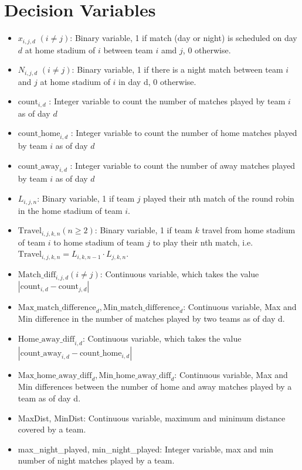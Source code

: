 \documentclass[a4paper, 12pt]{article}
\begin{document}
\section*{Decision Variables}
\begin{itemize}
    \item $x_{i,j,d}$ $(i \neq j)$: Binary variable, 1 if match (day or night) is scheduled on day $d$ at home stadium of $i$ between team $i$ amd $j$, 0 otherwise.
    \item $N_{i,j,d}$ $(i \neq j)$: Binary variable, 1 if there is a night match between team $i$ and $j$ at home stadium of $i$ in day d, 0 otherwise.
    \item $\text{count}_{i,d}$ : Integer variable to count the number of matches played by team $i$ as of day $d$
    \item $\text{count\_home}_{i,d}$ : Integer variable to count the number of home matches played by team $i$ as of day $d$
    \item $\text{count\_away}_{i,d}$ : Integer variable to count the number of away matches played by team $i$ as of day $d$
    \item $L_{i,j,n}$: Binary variable, 1 if team $j$ played their nth match of the round robin in the home stadium of team $i$.
    \item $\text{Travel}_{i,j,k,n} (n \geq 2)$: Binary variable, 1 if team $k$ travel from home stadium of team $i$ to home stadium of team $j$ to play their nth match, i.e. $\text{Travel}_{i,j,k,n} = L_{i,k,n-1}\cdot L_{j,k,n}$.
    \item $\text{Match\_diff}_{i,j,d} (i \neq j)$: Continuous variable, which takes the value $|\text{count}_{i,d} - \text{count}_{j,d}|$ 
    \item $\text{Max\_match\_difference}_{d},\text{Min\_match\_difference}_{d}$: Continuous variable, Max and Min difference in the number of matches played by two teams as of day d.
    \item $\text{Home\_away\_diff}_{i,d}$: Continuous variable, which takes the value $|\text{count\_away}_{i,d} - \text{count\_home}_{i,d}|$ 
    \item $\text{Max\_home\_away\_diff}_{d},\text{Min\_home\_away\_diff}_{d}$: Continuous variable, Max and Min differences between the number of home and away matches played by a team as of day d. 
    \item MaxDist, MinDist: Continuous variable, maximum and minimum distance covered by a team.
    \item max\_night\_played, min\_night\_played: Integer variable, max and min number of night matches played by a team.

\end{itemize}
\end{document}
